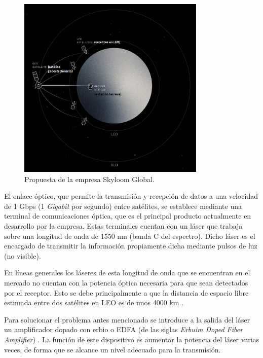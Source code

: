 \begin{figure}[H]
\centering
\includegraphics[width=0.8\textwidth]{./Figures/propuesta_skyloom.png}
\caption{Propuesta de la empresa Skyloom Global\protect\footnotemark.}
\label{fig:propSky}
\end{figure}


El enlace óptico, que permite la transmisión y recepción de datos a una velocidad de 1 Gbps (1 \textit{Gigabit} por segundo) entre satélites, se establece mediante una terminal de comunicaciones óptica, que es el principal producto actualmente en desarrollo por la empresa. Estas terminales cuentan con un láser que trabaja sobre una longitud de onda de 1550 nm (banda C del espectro). Dicho láser es el encargado de transmitir la información propiamente dicha mediante pulsos de luz (no visible).

En líneas generales los láseres de esta longitud de onda que se encuentran en el mercado no cuentan con la potencia óptica necesaria para que sean detectados por el receptor. Esto se debe principalmente a que la distancia de espacio libre estimada entre dos satélites en LEO es de unos 4000 km \citep{WEBSITE_SKY}.

Para solucionar el problema antes mencionado se introduce a la salida del láser un amplificador dopado con erbio o EDFA (de las siglas \textit{Erbuim Doped Fiber Amplifier}) \citep{WEBSITE:EDFA2}. La función de este dispositivo es aumentar la potencia del láser varias veces, de forma que se alcance un nivel adecuado para la transmisión.

